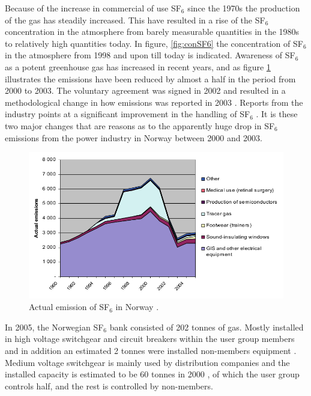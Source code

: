 \documentclass[10pt,a4paper]{article} %
\begin{document}
Because of the increase in commercial of use SF$_6$ since the 1970s the production of the gas has steadily increased. This have resulted in a rise of the SF$_6$ concentration in the atmosphere from barely measurable quantities in the 1980s \cite{bib:SF6PI} to relatively high quantities today. In figure, \ref{fig:conSF6} the concentration of SF$_6$ in the atmosphere from 1998 and upon till today is indicated. Awareness of SF$_6$ as a potent greenhouse gas has increased in recent years, and as figure \ref{fig:SF6EmissNor} illustrates the emissions have been reduced by almost a half in the period from 2000 to 2003. The voluntary agreement was signed in 2002 and resulted in a methodological change in how emissions was reported in 2003 \cite{bib:regSF6Miljo}. Reports from the industry points at a significant improvement in the handling of SF$_6$ \cite{bib:StatSF6}. It is these two major changes that are reasons as to the apparently huge drop in SF$_6$ emissions from the power industry in Norway between 2000 and 2003.

\begin{figure}[H]
\centering
\includegraphics[scale=0.6]{Bilder/Theory/emissionsSF6Norway.png}
\caption{Actual emission of SF$_6$ in Norway \cite{bib:StatSF6}.} \label{fig:SF6EmissNor}
\end{figure}

In 2005, the Norwegian SF$_6$ bank consisted of 202 tonnes of gas. Mostly installed in high voltage switchgear and circuit breakers within the user group members and in addition an estimated 2 tonnes were installed non-members equipment \cite{bib:StatSF6}. Medium voltage switchgear is mainly used by distribution companies and the installed capacity is estimated to be 60 tonnes in 2000 \cite{bib:StatSF6}, of which the user group controls half, and the rest is controlled by non-members.
\end{document}
